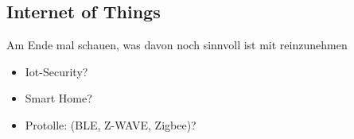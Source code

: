 \subsection{Internet of Things}
\label{sec:sota_iot}
    Am Ende mal schauen, was davon noch sinnvoll ist mit reinzunehmen 
    \begin{itemize}
        \item Iot-Security?
        \item Smart Home?
        \item Protolle: (BLE, Z-WAVE, Zigbee)?
    \end{itemize}
